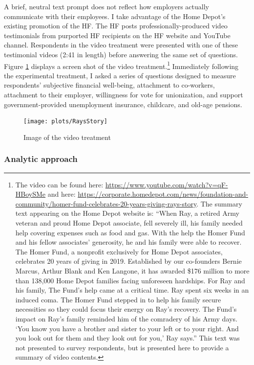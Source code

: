 \documentclass[
  11pt,
  oneside]{article}
\begin{document}
A brief, neutral text prompt does not reflect how employers actually communicate with their employees. I take advantage of the Home Depot's existing promotion of the HF. The HF posts professionally-produced video testimonials from purported HF recipients on the HF website and YouTube channel. Respondents in the video treatment were presented with one of these testimonial videos (2:41 in length) before answering the same set of questions. Figure \ref{fig:fig-ray} displays a screen shot of the video treatment.\footnote{The video can be found here: \url{https://www.youtube.com/watch?v=qF-HBoySMe} and here: \url{https://corporate.homedepot.com/news/foundation-and-community/homer-fund-celebrates-20-years-giving-rays-story}. The summary text appearing on the Home Depot website is: ``When Ray, a retired Army veteran and proud Home Depot associate, fell severely ill, his family needed help covering expenses such as food and gas. With the help the Homer Fund and his fellow associates' generosity, he and his family were able to recover. The Homer Fund, a nonprofit exclusively for Home Depot associates, celebrates 20 years of giving in 2019. Established by our co-founders Bernie Marcus, Arthur Blank and Ken Langone, it has awarded \$176 million to more than 138,000 Home Depot families facing unforeseen hardships. For Ray and his family, The Fund's help came at a critical time. Ray spent six weeks in an induced coma. The Homer Fund stepped in to help his family secure necessities so they could focus their energy on Ray's recovery. The Fund's impact on Ray's family reminded him of the comradery of his Army days. `You know you have a brother and sister to your left or to your right. And you look out for them and they look out for you,' Ray says.'' This text was not presented to survey respondents, but is presented here to provide a summary of video contents.} Immediately following the experimental treatment, I asked a series of questions designed to measure respondents' subjective financial well-being, attachment to co-workers, attachment to their employer, willingness for vote for unionization, and support government-provided unemployment insurance, childcare, and old-age pensions.

\begin{figure}
\texttt{[image: plots/RaysStory]} \caption{Image of the video treatment}\label{fig:fig-ray}
\end{figure}

\subsubsection{Analytic approach}\label{analytic-approach}
\end{document}
